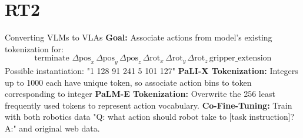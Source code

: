\documentclass{beamer}
\begin{document}
\section{RT2}

\begin{frame}[t]{Converting VLMs to VLAs}
    \textbf{Goal:} Associate actions from model's existing tokenization for: \newline
    \[\text{terminate } \Delta \text{pos}_x \, \Delta \text{pos}_y \, \Delta \text{pos}_z \, \Delta \text{rot}_x \, \Delta \text{rot}_y \, \Delta \text{rot}_z \, \text{gripper\_extension}\]
    Possible instantiation: "1 128 91 241 5 101 127" \newline
    \newline
    \textbf{PaLI-X Tokenization:} Integers up to 1000 each have unique token, so associate action bins to token corresponding to integer \newline  
    \textbf{PaLM-E Tokenization:} Overwrite the 256 least frequently used tokens to represent action vocabulary.
    \newline
    \textbf{Co-Fine-Tuning:} Train with both robotics data "Q: what action should robot take to [task instruction]? A:" and original web data. \newline
\end{frame}
\end{document}
